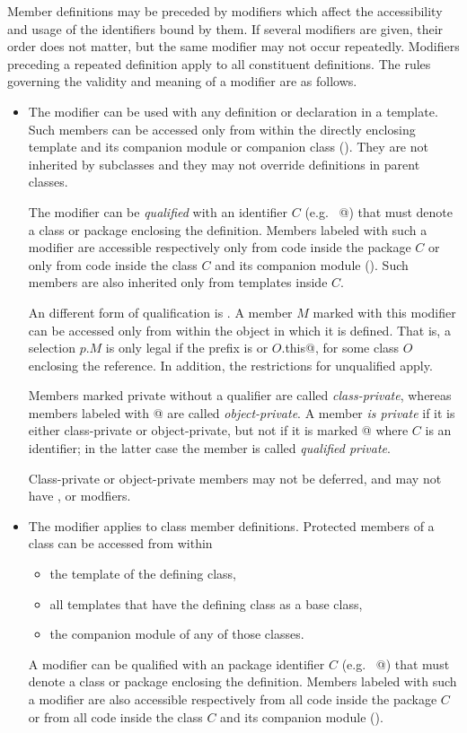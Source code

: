 Member definitions may be preceded by modifiers which affect the
accessibility and usage of the identifiers bound by them.  If several
modifiers are given, their order does not matter, but the same
modifier may not occur repeatedly.  Modifiers preceding a repeated
definition apply to all constituent definitions.  The rules governing
the validity and meaning of a modifier are as follows.
\begin{itemize}
\item
The  modifier can be used with any definition or
declaration in a template.  Such members can be accessed only from
within the directly enclosing template and its companion module or companion class
().  They
are not inherited by subclasses and they may not override definitions
in parent classes.

The modifier can be {\em qualified} with an identifier $C$ (e.g.
~\lstinline@private[$C$]@) that must denote a class or package
enclosing the definition.  Members labeled with such a modifier are
accessible respectively only from code inside the package $C$ or only
from code inside the class $C$ and its companion module
(). Such members are also inherited only from
templates inside $C$.

An different form of qualification is . A member
$M$ marked with this modifier can be accessed only from within
the object in which it is defined. That is, a selection $p.M$ is only
legal if the prefix is  or \lstinline@$O$.this@, for some
class $O$ enclosing the reference. In addition, the restrictions for
unqualified  apply.

Members marked private without a qualifier are called {\em
class-private}, whereas members labeled with \lstinline@private[this]@
are called {\em object-private}.  A member {\em is private} if it is
either class-private or object-private, but not if it is marked
\lstinline@private[$C$]@ where $C$ is an identifier; in the latter
case the member is called {\em qualified private}.

Class-private or object-private members may not be deferred, and may
not have ,  or  modfiers.
\item
The  modifier applies to class member definitions.
Protected members of a class can be accessed from within
\begin{itemize}
\item the template of the defining class, 
\item all templates that have the defining class as a base class,
\item the companion module of any of those classes.
\end{itemize}
A  modifier can be qualified with an package
identifier $C$ (e.g.  ~\lstinline@protected[$C$]@) that must denote a
class or package enclosing the definition.  Members labeled with such
a modifier are also accessible respectively from all code inside the
package $C$ or from all code inside the class $C$ and its companion
module ().


\end{itemize}
